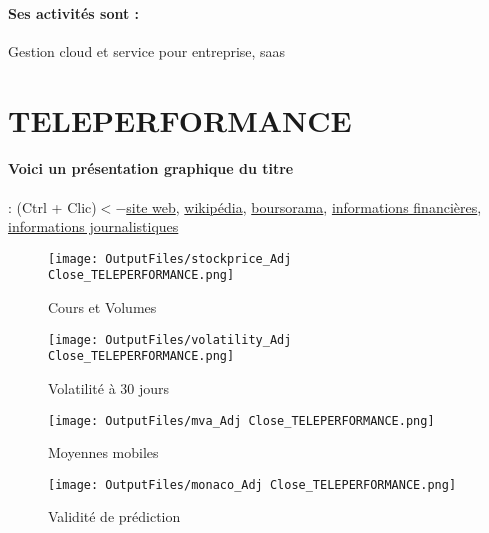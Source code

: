 \documentclass[11pt,a4paper]{report}%
\begin{document}
\paragraph{Ses activités sont : } Gestion cloud et service pour entreprise, saas 
    
    \newpage

\section{TELEPERFORMANCE}

\paragraph{Voici un présentation graphique du titre} : (Ctrl + Clic)$<-$\href{https://www.teleperformanceinvestorrelations.com/fr-fr/}{site web}, \href{https://fr.wikipedia.org/wiki/Teleperformance}{wikipédia}, \href{https://www.boursorama.com/cours/1rPTEP}{boursorama}, \href{https://www.qwant.com/?q=site:https:%2f%2fwww.easybourse.com%2faction-societe%2fTELEPERFORMANCE&t=web&client=ext-firefox-hp}{informations financières}, \href{https://bourse.lerevenu.com/cours-de-bourse/fiche-valeur-synthese/TELEPERFORMANCE/TEP-FR}{informations journalistiques}
\begin{figure}[!htb]
   \begin{minipage}{0.5\textwidth}
     \centering
     \texttt{[image: OutputFiles/stockprice\_Adj Close\_TELEPERFORMANCE.png]}
     \caption{Cours et Volumes}\label{Fig:price_TELEPERFORMANCE}
   \end{minipage}\hfill
   \begin{minipage}{0.5\textwidth}
     \centering
     \texttt{[image: OutputFiles/volatility\_Adj Close\_TELEPERFORMANCE.png]}
     \caption{Volatilité à 30 jours}\label{Fig:volat_TELEPERFORMANCE}
   \end{minipage}
\end{figure}
\begin{figure}[!htb]
   \begin{minipage}{0.5\textwidth}
     \centering
     \texttt{[image: OutputFiles/mva\_Adj Close\_TELEPERFORMANCE.png]}
     \caption{Moyennes mobiles}\label{Fig:mva_TELEPERFORMANCE}
   \end{minipage}\hfill
   \begin{minipage}{0.5\textwidth}
     \centering
     \texttt{[image: OutputFiles/monaco\_Adj Close\_TELEPERFORMANCE.png]}
     \caption{Validité de prédiction}\label{Fig:prediction_TELEPERFORMANCE}
   \end{minipage}
\end{figure}
\end{document}
